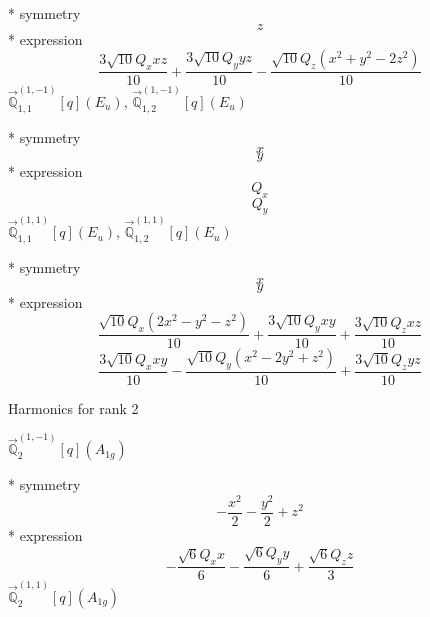 \documentclass[fleqn,8pt]{jsarticle}
\begin{document}
\noindent\quad ** symmetry
\begin{dmath*}
z
\end{dmath*}
\noindent\quad ** expression
\begin{dmath*}
\frac{3 \sqrt{10} Q_{x} x z}{10} + \frac{3 \sqrt{10} Q_{y} y z}{10} - \frac{\sqrt{10} Q_{z} \left(x^{2} + y^{2} - 2 z^{2}\right)}{10}
\end{dmath*}
\noindent\quad $\vec{\mathbb{Q}}_{1,1}^{(1,-1)}[q](E_{u})$, $\vec{\mathbb{Q}}_{1,2}^{(1,-1)}[q](E_{u})$

\noindent\quad ** symmetry
\begin{dmath*}
x
\end{dmath*}
\begin{dmath*}
y
\end{dmath*}
\noindent\quad ** expression
\begin{dmath*}
Q_{x}
\end{dmath*}
\begin{dmath*}
Q_{y}
\end{dmath*}
\noindent\quad $\vec{\mathbb{Q}}_{1,1}^{(1,1)}[q](E_{u})$, $\vec{\mathbb{Q}}_{1,2}^{(1,1)}[q](E_{u})$

\noindent\quad ** symmetry
\begin{dmath*}
x
\end{dmath*}
\begin{dmath*}
y
\end{dmath*}
\noindent\quad ** expression
\begin{dmath*}
\frac{\sqrt{10} Q_{x} \left(2 x^{2} - y^{2} - z^{2}\right)}{10} + \frac{3 \sqrt{10} Q_{y} x y}{10} + \frac{3 \sqrt{10} Q_{z} x z}{10}
\end{dmath*}
\begin{dmath*}
\frac{3 \sqrt{10} Q_{x} x y}{10} - \frac{\sqrt{10} Q_{y} \left(x^{2} - 2 y^{2} + z^{2}\right)}{10} + \frac{3 \sqrt{10} Q_{z} y z}{10}
\end{dmath*}

\noindent * Harmonics for rank 2

\noindent\quad $\vec{\mathbb{Q}}_{2}^{(1,-1)}[q](A_{1g})$

\noindent\quad ** symmetry
\begin{dmath*}
- \frac{x^{2}}{2} - \frac{y^{2}}{2} + z^{2}
\end{dmath*}
\noindent\quad ** expression
\begin{dmath*}
- \frac{\sqrt{6} Q_{x} x}{6} - \frac{\sqrt{6} Q_{y} y}{6} + \frac{\sqrt{6} Q_{z} z}{3}
\end{dmath*}
\noindent\quad $\vec{\mathbb{Q}}_{2}^{(1,1)}[q](A_{1g})$
\end{document}
